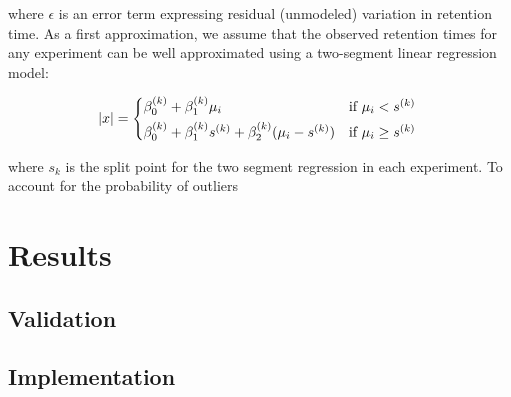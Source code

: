 \begin{spacing}{1.55}
where $\epsilon$ is an error term expressing residual (unmodeled) variation in retention time.  As a first approximation, we assume that the observed retention times for any experiment can be well approximated using a two-segment linear regression model: 


\[ \lvert x\rvert = \begin{cases*}
                    \beta_0^{(k)} + \beta_1^{(k)}\mu_i & if  $\mu_i < s^{(k)}$  \\
                        \beta_0^{(k)} + \beta_1^{(k)}s^{(k)} + \beta_2^{(k)}(\mu_i - s^{(k)})    & if $\mu_i \ge s^{(k)}$
                 \end{cases*} \]%

where $s_k$ is the split point for the two segment regression in each experiment.  To account for the probability of outliers

\section{Results}

\subsection{Validation}

\subsection{Implementation}


\printbibliography

\end{spacing}

